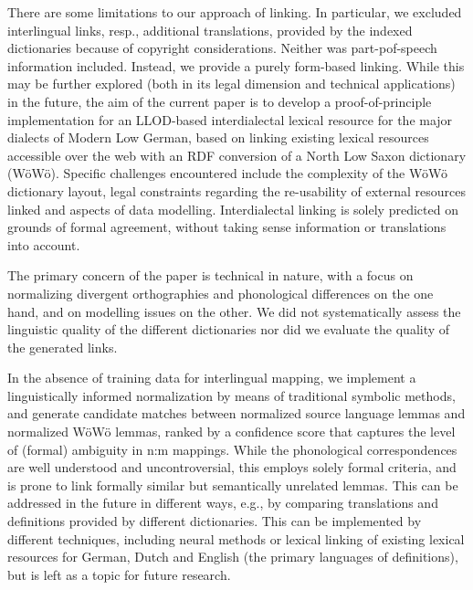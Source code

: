 \documentclass[11pt]{article}
\begin{document}
There are some limitations to our approach of linking. In particular, we excluded interlingual links, resp., additional translations, provided by the indexed dictionaries because of copyright considerations. Neither was part-pof-speech information included. Instead, we provide a purely form-based linking. While this may be further explored (both in its legal dimension and technical applications) in the future, the aim of the current paper is to develop a proof-of-principle implementation for an LLOD-based interdialectal lexical resource for the major dialects of Modern Low German, based on linking existing lexical resources accessible over the web with an RDF conversion of a North Low Saxon dictionary (WöWö). Specific challenges encountered include the complexity of the WöWö dictionary layout, legal constraints regarding the re-usability of external resources linked and aspects of data modelling. Interdialectal linking is solely predicted on grounds of formal agreement, without taking sense information or translations into account.

The primary concern of the paper is technical in nature, with a focus on normalizing divergent orthographies and phonological differences on the one hand, and on modelling issues on the other. We did not systematically assess the linguistic quality of the different dictionaries nor did we evaluate the quality of the generated links. 

In the absence of training data for interlingual mapping, we implement a linguistically informed normalization by means of traditional symbolic methods, and generate candidate matches between normalized source language lemmas and normalized WöWö lemmas, ranked by a confidence score that captures the level of (formal) ambiguity in n:m mappings. While the phonological correspondences are well understood and uncontroversial, this employs solely formal criteria, and is prone to link formally similar but semantically unrelated lemmas. This can be addressed in the future in different ways, e.g., by comparing translations and definitions provided by different dictionaries. This can be implemented by different techniques, including neural methods or lexical linking of existing lexical resources for German, Dutch and English (the primary languages of definitions), but is left as a topic for future research. 

%


%
%
\end{document}
